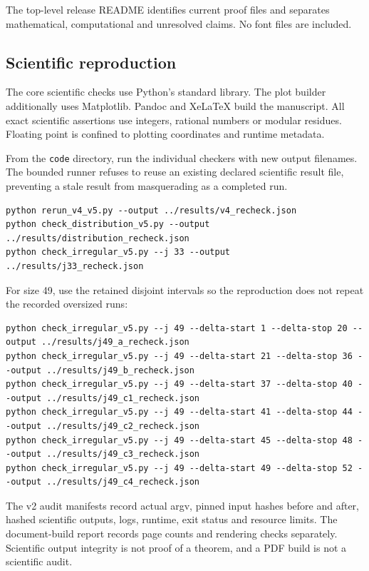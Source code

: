 \documentclass[11pt,letterpaper]{article}
\begin{document}
The top-level release README identifies current proof files and separates mathematical, computational and unresolved claims. No font files are included.

\subsection{Scientific reproduction}\label{scientific-reproduction}

The core scientific checks use Python's standard library. The plot builder additionally uses Matplotlib. Pandoc and XeLaTeX build the manuscript. All exact scientific assertions use integers, rational numbers or modular residues. Floating point is confined to plotting coordinates and runtime metadata.

From the \texttt{code} directory, run the individual checkers with new output filenames. The bounded runner refuses to reuse an existing declared scientific result file, preventing a stale result from masquerading as a completed run.

\begin{verbatim}
python rerun_v4_v5.py --output ../results/v4_recheck.json
python check_distribution_v5.py --output ../results/distribution_recheck.json
python check_irregular_v5.py --j 33 --output ../results/j33_recheck.json
\end{verbatim}

For size 49, use the retained disjoint intervals so the reproduction does not repeat the recorded oversized runs:

\begin{verbatim}
python check_irregular_v5.py --j 49 --delta-start 1 --delta-stop 20 --output ../results/j49_a_recheck.json
python check_irregular_v5.py --j 49 --delta-start 21 --delta-stop 36 --output ../results/j49_b_recheck.json
python check_irregular_v5.py --j 49 --delta-start 37 --delta-stop 40 --output ../results/j49_c1_recheck.json
python check_irregular_v5.py --j 49 --delta-start 41 --delta-stop 44 --output ../results/j49_c2_recheck.json
python check_irregular_v5.py --j 49 --delta-start 45 --delta-stop 48 --output ../results/j49_c3_recheck.json
python check_irregular_v5.py --j 49 --delta-start 49 --delta-stop 52 --output ../results/j49_c4_recheck.json
\end{verbatim}

The v2 audit manifests record actual argv, pinned input hashes before and after, hashed scientific outputs, logs, runtime, exit status and resource limits. The document-build report records page counts and rendering checks separately. Scientific output integrity is not proof of a theorem, and a PDF build is not a scientific audit.
\end{document}
